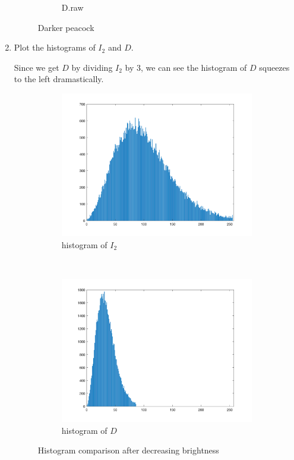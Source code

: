 \documentclass{article}
\begin{document}
\begin{enumerate}[label=(\alph*)]
\begin{figure}[!htb]
\begin{subfigure}[b]{0.3\textwidth}
            \caption{D.raw}
        \end{subfigure}
        \caption{Darker peacock}
        \label{Darker peacock}
    \end{figure}

    \newpage
    \item Plot the histograms of $I_2$ and $D$.
    
    Since we get $D$ by dividing $I_2$ by $3$, we can see the histogram of $D$ squeezes to the left dramastically.
    
    \begin{figure}[!htb]
        \centering
        \begin{subfigure}[b]{0.45\textwidth}
            \includegraphics[width=\textwidth]{img/hist_I2.png}
            \caption{histogram of $I_2$}
        \end{subfigure}
        ~
        \begin{subfigure}[b]{0.45\textwidth}
            \includegraphics[width=\textwidth]{img/hist_D.png}
            \caption{histogram of $D$}
        \end{subfigure}
        \caption{Histogram comparison after decreasing brightness}
        \label{Histogram comparison after decreasing brightness}
    \end{figure}


\end{enumerate}
\end{document}

